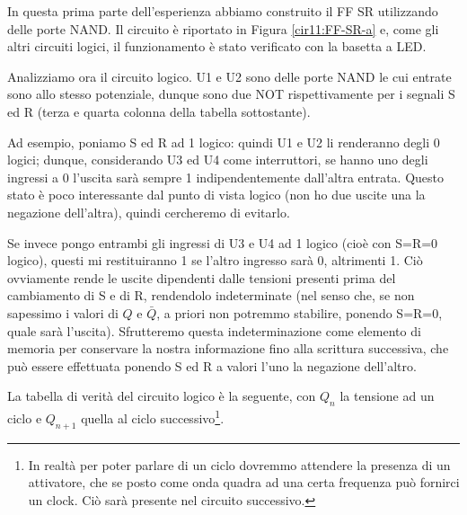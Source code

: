 In questa prima parte dell'esperienza abbiamo construito il FF SR utilizzando delle porte NAND.
Il circuito è riportato in Figura \ref{cir11:FF-SR-a} e, come gli altri circuiti logici, il funzionamento è stato verificato con la basetta a LED.

Analizziamo ora il circuito logico.
U1 e U2 sono delle porte NAND le cui entrate sono allo stesso potenziale, dunque sono due NOT rispettivamente per i segnali S ed R (terza e quarta colonna della tabella sottostante).

Ad esempio, poniamo S ed R ad 1 logico: quindi U1 e U2 li renderanno degli 0 logici; dunque, considerando U3 ed U4 come interruttori, se hanno uno degli ingressi a 0 l'uscita sarà sempre 1 indipendentemente dall'altra entrata.
Questo stato è poco interessante dal punto di vista logico (non ho due uscite una la negazione dell'altra), quindi cercheremo di evitarlo.

Se invece pongo entrambi gli ingressi di U3 e U4 ad 1 logico (cioè con S=R=0 logico), questi mi restituiranno 1 se l'altro ingresso sarà 0, altrimenti 1.
Ciò ovviamente rende le uscite dipendenti dalle tensioni presenti prima del cambiamento di S e di R, rendendolo indeterminate (nel senso che, se non sapessimo i valori di $Q$ e $\bar Q$, a priori non potremmo stabilire, ponendo S=R=0, quale sarà l'uscita).
Sfrutteremo questa indeterminazione come elemento di memoria per conservare la nostra informazione fino alla scrittura successiva, che può essere effettuata ponendo S ed R a valori l'uno la negazione dell'altro.

La tabella di verità del circuito logico è la seguente, con $Q_n$ la tensione ad un ciclo e $Q_{n+1}$ quella al ciclo successivo\footnote{In realtà per poter parlare di un ciclo dovremmo attendere la presenza di un attivatore, che se posto come onda quadra ad una certa frequenza può fornirci un clock.
Ciò sarà presente nel circuito successivo.}.

